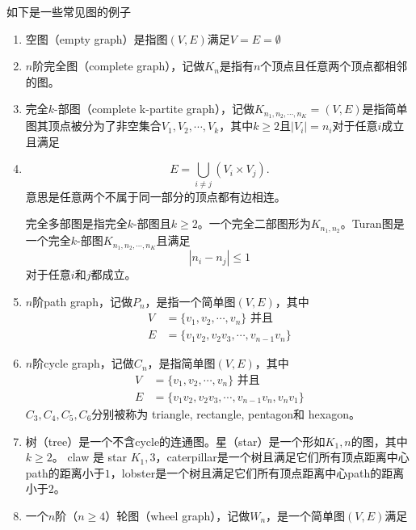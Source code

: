 \begin{definition}
	如下是一些常见图的例子
	\begin{enumerate}
		\item 空图（empty graph）是指图$(V, E)$满足$V = E = \emptyset$
		\item $n$阶完全图（complete graph），记做$K_n$是指有$n$个顶点且任意两个顶点都相邻的图。
		\item 完全$k$-部图（complete k-partite graph），记做$K_{n_1, n_2, \cdots, n_K} = (V, E)$是指简单图其顶点被分为了非空集合$V_1, V_2, \cdots , V_k$，其中$k\geq 2$且$|V_i|=n_i$对于任意$i$成立且满足
		\item \begin{equation*}
			E = \bigcup\limits_{i\neq j}(V_i\times V_j).
		\end{equation*}
		意思是任意两个不属于同一部分的顶点都有边相连。\par
		完全多部图是指完全$k$-部图且$k\geq 2$。一个完全二部图形为$K_{n_1, n_2}$。Turan图是一个完全$k$-部图$K_{n_1, n_2, \cdots, n_K}$且满足
		\begin{equation*}
			|n_i - n_j|\leq 1
		\end{equation*}
		对于任意$i$和$j$都成立。
		\item $n$阶path graph，记做$P_n$，是指一个简单图$(V, E)$，其中
		\begin{equation*}
			\begin{split}
				V &= \{v_1, v_2,\cdots, v_n\}\text{ 并且 }\\
				E &= \{v_1v_2, v_2v_3, \cdots, v_{n-1}v_n\}
			\end{split}
		\end{equation*}
		\item $n$阶cycle graph，记做$C_n$，是指简单图$(V, E)$，其中
		\begin{equation*}
			\begin{split}
				V &=\{v_1, v_2,\cdots, v_n\}\text{ 并且 }\\
				E &= \{v_1v_2, v_2v_3, \cdots, v_{n-1}v_n, v_nv_1\}
			\end{split}
		\end{equation*}
		$C_3, C_4, C_5, C_6$分别被称为 triangle, rectangle, pentagon和 hexagon。
		\item 树（tree）是一个不含cycle的连通图。星（star）是一个形如$K_1, n$的图，其中$k\geq 2$。 claw 是 star $K_1, 3$，caterpillar是一个树且满足它们所有顶点距离中心path的距离小于$1$，lobster是一个树且满足它们所有顶点距离中心path的距离小于$2$。
		\item 一个$n$阶（$n\geq 4$）轮图（wheel graph），记做$W_n$，是一个简单图$(V, E)$满足

\end{enumerate}
\end{definition}
